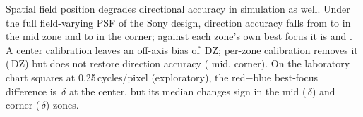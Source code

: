 \documentclass{ieee-ojvt}
\begin{document}
Spatial field position degrades directional accuracy in simulation as well.
Under the full field-varying PSF of the Sony design, direction accuracy falls from \MsevenUniMidDir{} to \MsevenFvMidDir{} in the mid zone and to \MsevenFvCornerDir{} in the corner; against each zone's own best focus it is \MsevenFvMidDirLocal{} and \MsevenFvCornerDirLocal. A center calibration leaves an off-axis bias of \MsevenFvMidBias\,DZ; per-zone calibration removes it (\MsevenZcMidBias\,DZ) but does not restore direction accuracy (\MsevenZcMidDir{} mid, \MsevenZcCornerDir{} corner). On the laboratory chart squares at 0.25\,cycles/pixel (exploratory), the red$-$blue best-focus difference is \MsevenLabCenter\,$\delta$ at the center, but its median changes sign in the mid (\MsevenLabMid\,$\delta$) and corner (\MsevenLabCorner\,$\delta$) zones.
\end{document}
